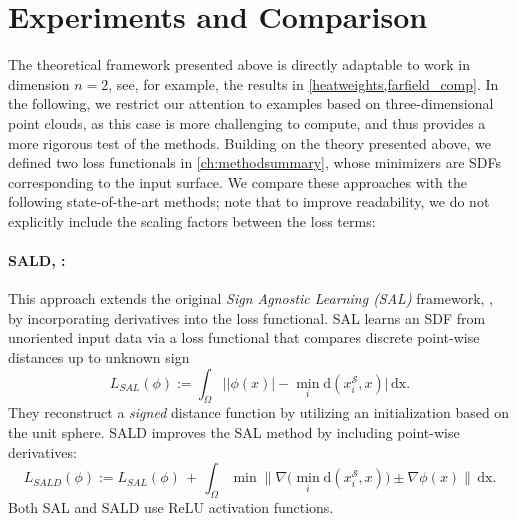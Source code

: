 \documentclass[draft,12pt,openany]{book}
\def\S{\mathcal{S}}
\theoremstyle{plainnormal}
\theoremstyle{remark}
\begin{document}
\section{Experiments and Comparison}\label{Comps}
The theoretical framework presented above is directly adaptable to work in dimension $n=2$, see, for example, the results in \cref{heatweights,farfield_comp}. In the following, we restrict our attention to examples based on three-dimensional point clouds, as this case is more challenging to compute, and thus provides a more rigorous test of the methods. Building on the theory presented above, we defined two loss functionals in \cref{ch:methodsummary}, whose minimizers are SDFs corresponding to the input surface. We compare these approaches with the following state-of-the-art methods; note that to improve readability, we do not explicitly include the scaling factors between the loss terms:
\paragraph{SALD, \cite{SALD}:} This approach extends the original \emph{Sign Agnostic Learning (SAL)} framework, \cite{SAL}, by incorporating derivatives into the loss functional. SAL learns an SDF from unoriented input data via a loss functional that compares discrete point-wise distances up to unknown sign
$$L_{SAL}(\phi) := \int_\Omega\big||\phi(x)| - \min_{i} \mathrm{d}( x_i^\S, x)\big|\,\mathrm{dx}.
$$
They reconstruct a \emph{signed} distance function by utilizing an initialization based on the unit sphere.
SALD improves the SAL method by including point-wise derivatives:
$$L_{SALD}(\phi) := L_{SAL}(\phi)\, +\, \int_\Omega \min \|\nabla\big(\min_{i} \mathrm{d}( x_i^\S, x)\big) \pm \nabla \phi(x)\|  \,\mathrm{dx}.$$
Both SAL and SALD use ReLU activation functions.
\end{document}
